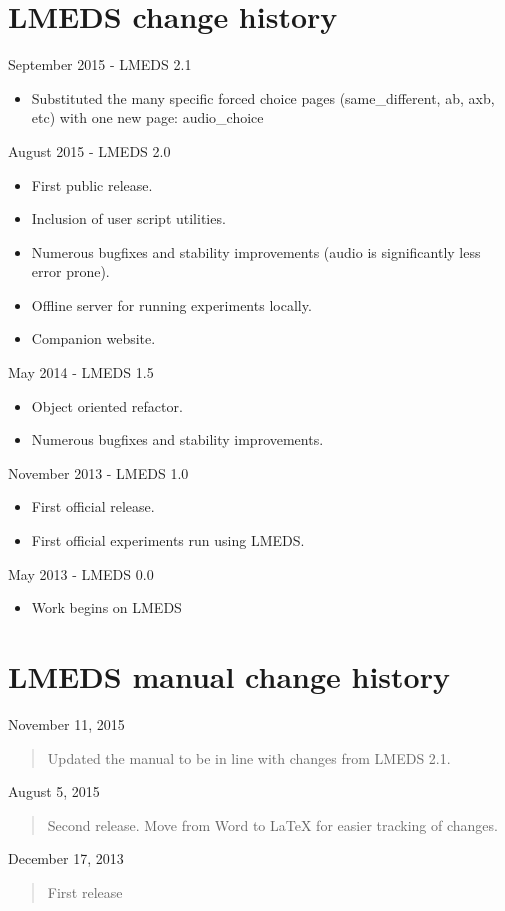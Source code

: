 
\section{LMEDS change history}

September 2015 - LMEDS 2.1

\begin{itemize}
\item Substituted the many specific forced choice pages (same\_different, ab, axb, etc) with one new page: audio\_choice
\end{itemize}

August 2015 - LMEDS 2.0

\begin{itemize}
\item First public release.  
\item Inclusion of user script utilities.
\item Numerous bugfixes and stability improvements (audio is significantly less error prone).  
\item Offline server for running experiments locally.
\item Companion website.
\end{itemize}

May 2014 - LMEDS 1.5

\begin{itemize}
\item Object oriented refactor.
\item Numerous bugfixes and stability improvements.
\end{itemize}

November 2013 - LMEDS 1.0

\begin{itemize}
\item First official release.  
\item First official experiments run using LMEDS.
\end{itemize}

May 2013 - LMEDS 0.0

\begin{itemize}
\item Work begins on LMEDS
\end{itemize}


\section{LMEDS manual change history}

November 11, 2015

\begin{quote}
Updated the manual to be in line with changes from LMEDS 2.1.
\end{quote}

August 5, 2015

\begin{quote}
Second release.  Move from Word to LaTeX for easier tracking of changes.
\end{quote}

December 17, 2013


\begin{quote}
First release
\end{quote}


